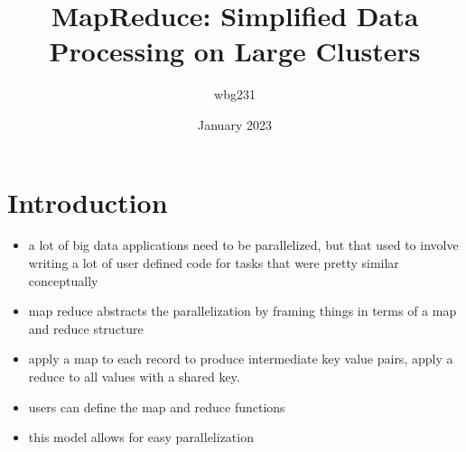 \documentclass{article}
\title{MapReduce: Simplified Data Processing
on Large Clusters}
\author{wbg231 }
\date{January 2023}
\begin{document}
\maketitle

\section{Introduction}
\begin{itemize}
    \item a lot of big data applications need to be parallelized, but that used to involve writing a lot of user defined code for tasks that were pretty similar conceptually
    \item map reduce abstracts the parallelization by framing things in terms of a map and reduce structure
    \item apply a map to each record to produce intermediate key value pairs, apply a reduce to all values with a shared key. 
    \item users can define the map and reduce functions 
    \item this model allows for easy parallelization

\end{itemize}
\end{document}
